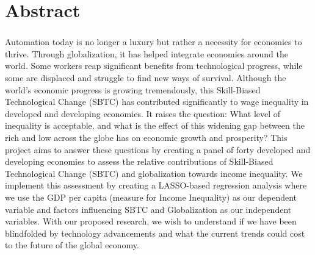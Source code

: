 \chapter*{Abstract} 
\subsection*{\thesistitle}



\hspace{10pt}Automation today is no longer a luxury but rather a necessity for economies to thrive. Through globalization, it has helped integrate economies around the world. Some workers reap significant benefits from technological progress, while some are displaced and struggle to find new ways of survival. Although the world's economic progress is growing tremendously, this Skill-Biased Technological Change (SBTC) has contributed significantly to wage inequality in developed and developing economies. It raises the question: What level of inequality is acceptable, and what is the effect of this widening gap between the rich and low across the globe has on economic growth and prosperity? This project aims to answer these questions by creating a panel of forty developed and developing economies to assess the relative contributions of Skill-Biased Technological Change (SBTC) and globalization towards income inequality. We implement this assessment by creating a LASSO-based regression analysis where we use the GDP per capita (measure for Income Inequality) as our dependent variable and factors influencing SBTC and Globalization as our independent variables. With our proposed research, we wish to understand if we have been blindfolded by technology advancements and what the current trends could cost to the future of the global economy.